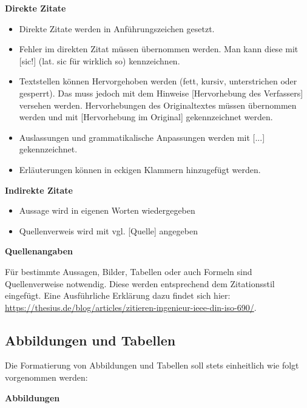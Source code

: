\textbf{Direkte Zitate}

\begin{itemize}
    \item Direkte Zitate werden in Anführungszeichen gesetzt.
    \item Fehler im direkten Zitat müssen übernommen werden. Man kann diese mit [sic!] (lat. sic für \glqq wirklich so\grqq) kennzeichnen.
    \item Textstellen können Hervorgehoben werden (fett, kursiv, unterstrichen oder gesperrt). Das muss jedoch mit dem Hinweise [Hervorhebung des Verfassers] versehen werden. Hervorhebungen des Originaltextes müssen übernommen werden und mit [Hervorhebung im Original] gekennzeichnet werden.
    \item Auslassungen und grammatikalische Anpassungen werden mit [...] gekennzeichnet.
    \item Erläuterungen können in eckigen Klammern hinzugefügt werden.
\end{itemize}

\textbf{Indirekte Zitate}

\begin{itemize}
    \item Aussage wird in eigenen Worten wiedergegeben
    \item Quellenverweis wird mit \glqq vgl. [Quelle]\grqq{} angegeben
\end{itemize}

\textbf{Quellenangaben}

Für bestimmte Aussagen, Bilder, Tabellen oder auch Formeln sind Quellenverweise notwendig. Diese werden entsprechend dem Zitationsstil eingefügt. Eine Ausführliche Erklärung dazu findet sich hier: \url{https://thesius.de/blog/articles/zitieren-ingenieur-ieee-din-iso-690/}.

\subsection{Abbildungen und Tabellen}

Die Formatierung von Abbildungen und Tabellen soll stets einheitlich wie folgt vorgenommen werden:

\textbf{Abbildungen}

